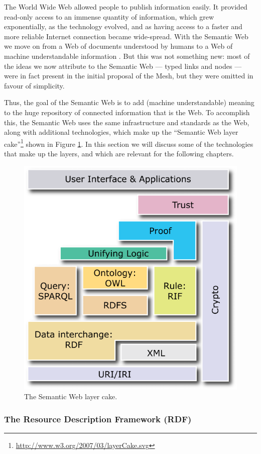 The World Wide Web \cite{BernersLee1994} allowed people to publish information easily. It provided read-only access to an immense quantity of information, which grew exponentially, as the technology evolved, and as having access to a faster and more reliable Internet connection became wide-spread. With the Semantic Web we move on from a Web of documents understood by humans to a Web of machine understandable information  \cite{BernersLee2001}. But this was not something new: most of the ideas we now attribute to the Semantic Web --- typed links and nodes --- were in fact present in the initial proposal of the Mesh, but they were omitted in favour of simplicity.

Thus, the goal of the Semantic Web is to add (machine understandable) meaning to the huge repository of connected information that is the Web. To accomplish this, the Semantic Web uses the same infrastructure and standards as the Web, along with additional technologies, which make up the ``Semantic Web layer cake''\footnote{\url{http://www.w3.org/2007/03/layerCake.svg}} shown in Figure \ref{fig:swlayercake}. In this section we will discuss some of the technologies that make up the layers, and which are relevant for the following chapters.

\begin{figure}[tb]
 \includegraphics[width=0.7\linewidth]{chapters/background/img/layerCake.png}
\caption{The Semantic Web layer cake.}
\label{fig:swlayercake}
\end{figure}

\subsubsection{The Resource Description Framework (RDF)}

